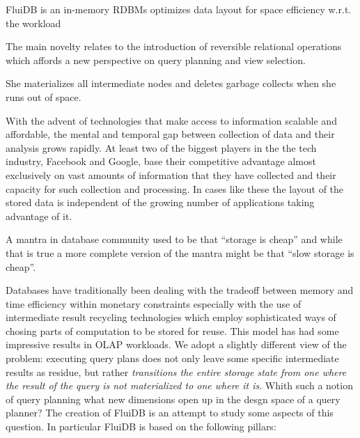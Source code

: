 
\begin{summary}
\item FluiDB is an in-memory RDBMs optimizes data layout for space
  efficiency w.r.t. the workload
\item The main novelty relates to the introduction of reversible
  relational operations which affords a new perspective on query
  planning and view selection.
\item She materializes all intermediate nodes and deletes garbage
  collects when she runs out of space.
\end{summary}

With the advent of technologies that make access to information
scalable and affordable, the mental and temporal gap between
collection of data and their analysis grows rapidly. At least two of
the biggest players in the the tech industry, Facebook and Google,
base their competitive advantage almost exclusively on vast amounts of
information that they have collected and their capacity for such
collection and processing. In cases like these the layout of the
stored data is independent of the growing number of applications
taking advantage of it.

A mantra in database community used to be that ``storage is cheap''
and while that is true a more complete version of the mantra might be
that ``slow storage is cheap''.

Databases have traditionally been dealing with the tradeoff between
memory and time efficiency within monetary constraints especially with
the use of intermediate result recycling technologies which employ
sophisticated ways of chosing parts of computation to be stored for
reuse. This model has had some impressive results in OLAP
workloads. We adopt a slightly different view of the problem:
executing query plans does not only leave some specific intermediate
results as residue, but rather \emph{transitions the entire storage
  state from one where the result of the query is not materialized to
  one where it is}. Whith such a notion of query planning what new
dimensions open up in the desgn space of a query planner? The creation
of FluiDB is an attempt to study some aspects of this question. In
particular FluiDB is based on the following pillars:

